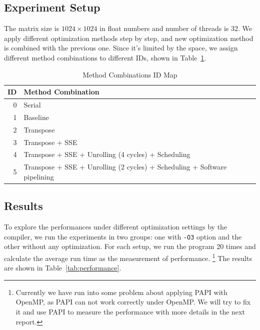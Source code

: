 \documentclass[12pt]{article}
\begin{document}
\subsection{Experiment Setup}
The matrix size is $1024\times 1024$ in float numbers and number of 
threads is 32. We apply different optimization methods step by step, 
and new optimization method is combined with the previous one. Since 
it's limited by the space, we assign different method combinations to 
different IDs, shown in Table~\ref{tab:methods}.

\begin{table}[h!]
	\small
	\begin{center}
	\caption{\label{tab:methods} Method Combinations ID Map}
	\begin{tabular}{|r|l|}
		\hline
		ID & Method Combination \\ \hline
		0 &	Serial \\ \hline
		1 & Baseline \\ \hline
    2 & Transpose \\ \hline
    3 & Transpose + SSE \\ \hline
    4 & Transpose + SSE + Unrolling (4 cycles) + Scheduling \\ \hline
    5 & Transpose + SSE + Unrolling (2 cycles) + Scheduling + 
      Software pipelining \\ \hline
	\end{tabular}
	\end{center}
\end{table}

\subsection{Results}
To explore the performances under different optimization settings by 
the compiler, we run the experiments in two groups: one with \texttt{-O3}
option and the other without any optimization. For each setup, we 
run the program 20 times and calculate the average run time as the 
measurement of performance. \footnote{Currently we have run into some
problem about applying PAPI with OpenMP, as PAPI can not work correctly
under OpenMP. We will try to fix it and use PAPI to measure the 
performance with more details in the next report.} The results are shown
in Table~\ref{tab:performance}.
\end{document}
